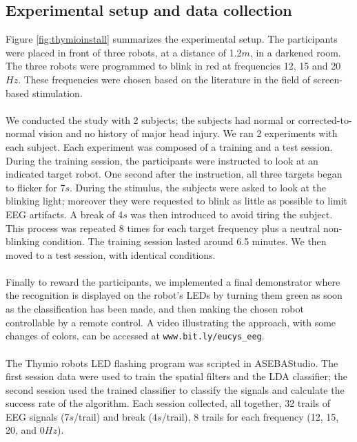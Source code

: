 \documentclass{svmult}
\begin{document}
\subsection{Experimental setup and data collection}
Figure \ref{fig:thymioinstall} summarizes the experimental setup. The participants were placed in front of three robots, at a distance of 1.2$m$, in a darkened room. The three robots were programmed to blink in red at frequencies 12, 15 and 20$Hz$. These frequencies were chosen based on the literature in the field of screen-based stimulation.\\
\\
We conducted the study with 2 subjects; the subjects had normal or corrected-to-normal vision and no history of major head injury. We ran 2 experiments with each subject. Each experiment was composed of a training and a test session. During the training session, the participants were instructed to look at an indicated target robot. One second after the instruction, all three targets began to flicker for 7$s$. During the stimulus, the subjects were asked to look at the blinking light; moreover they were requested to blink as little as possible to limit EEG artifacts. A break of 4$s$ was then introduced to avoid tiring the subject. This process was repeated 8 times for each target frequency plus a neutral non-blinking condition. The training session lasted around 6.5 minutes. We then moved to a test session, with identical conditions. \\
\\
Finally to reward the participants, we implemented a final demonstrator where the recognition is displayed on the robot's LEDs by turning them green as soon as the classification has been made, and then making the chosen robot controllable by a remote control. A video illustrating the approach, with some changes of colors, can be accessed at \verb"www.bit.ly/eucys_eeg". \\
\\
The Thymio robots LED flashing program was scripted in ASEBAStudio. The first session data were used to train the spatial filters and the LDA classifier; the second session used the trained classifier to classify the signals and calculate the success rate of the algorithm. Each session collected, all together, 32 trails of EEG signals (7$s$/trail) and break (4$s$/trail), 8 trails for each frequency (12, 15, 20, and 0$Hz$). 
\end{document}
